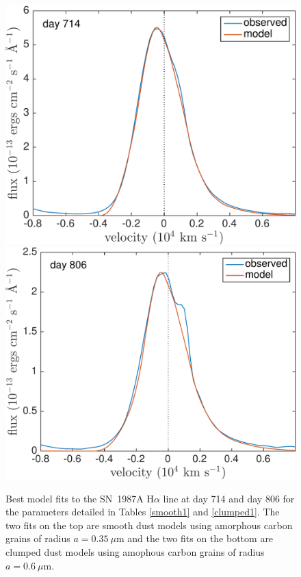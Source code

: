 \begin{figure}
\includegraphics[trim =25 0 0 0,clip=true,scale=0.4]{chapters/chapter5/images/clump_1/best_fit/d714Ha_new.pdf}
\includegraphics[trim =25 0 0 0,clip=true,scale=0.4]{chapters/chapter5/images/clump_1/best_fit/d806Ha_new.pdf}
\caption{Best model fits to the SN~1987A H$\alpha$ line at day 714 
and day 806 for the parameters detailed in Tables \ref{smooth1} and \ref{clumped1}. The two fits on the top are smooth dust models using amorphous carbon grains of radius $a=0.35~\mu$m and the two fits on the bottom are clumped dust models using amophous carbon grains of radius $a=0.6~\mu$m.}
\label{Ha}

\end{figure}


